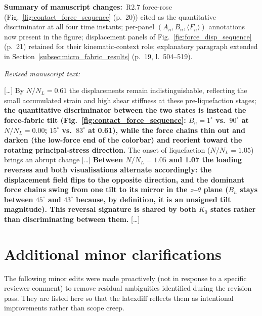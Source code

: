 \documentclass[11pt,a4paper]{article}
\newcommand{\changed}[1]{\par\noindent\textbf{Summary of manuscript changes:}\ #1\par}
\newenvironment{revtext}
  {\par\vspace{0.2em}\noindent\textit{Revised manuscript text:}\par
   \begingroup\color{black}\begin{leftbar}\small}
  {\end{leftbar}\endgroup\vspace{0.3em}}
\newcommand{\manref}[1]{(#1)}                  %
\newcommand{\Kzero}{\ensuremath{K_0}}
\begin{document}
\changed{R2.7 force-rose (Fig.~\ref{fig:contact_force_sequence}
\manref{p.~20}) cited as the quantitative discriminator at all four
time instants; per-panel $(A_n, B_n, \langle F_n\rangle)$ annotations
now present in the figure; displacement panels of
Fig.~\ref{fig:force_disp_sequence} \manref{p.~21} retained for
their kinematic-context role; explanatory paragraph extended in
Section~\ref{subsec:micro_fabric_results}
\manref{p.~19, l.~504--519}.}

\begin{revtext}
[\ldots] By $N/N_L = 0.61$ the displacements remain
indistinguishable, reflecting the small accumulated strain and high
shear stiffness at these pre-liquefaction stages; \textbf{the
quantitative discriminator between the two states is instead the
force-fabric tilt (Fig.~\ref{fig:contact_force_sequence}: $B_n =
1^\circ$ vs.\ $90^\circ$ at $N/N_L = 0.00$; $15^\circ$ vs.\
$83^\circ$ at 0.61), while the force chains thin out and darken
(the low-force end of the colorbar) and reorient toward the
rotating principal-stress direction.} The onset of liquefaction
($N/N_L = 1.05$) brings an abrupt change [\ldots] \textbf{Between
$N/N_L = 1.05$ and 1.07 the loading reverses and both visualisations
alternate accordingly: the displacement field flips to the opposite
direction, and the dominant force chains swing from one tilt to its
mirror in the $z$--$\theta$ plane ($B_n$ stays between $45^\circ$
and $43^\circ$ because, by definition, it is an unsigned tilt
magnitude). This reversal signature is shared by both \Kzero{}
states rather than discriminating between them.} [\ldots]
\end{revtext}

\clearpage

\section*{Additional minor clarifications}

The following minor edits were made proactively (not in response to a
specific reviewer comment) to remove residual ambiguities identified
during the revision pass. They are listed here so that the latexdiff
reflects them as intentional improvements rather than scope creep.
\end{document}

